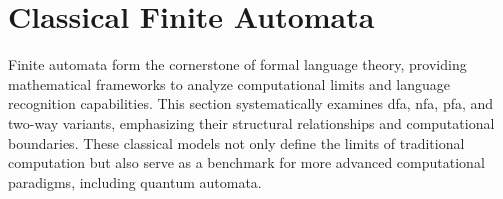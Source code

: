 \section{Classical Finite Automata}
\label{sec:classical-finite-automata} 

Finite automata form the cornerstone of formal language theory, providing mathematical frameworks to analyze computational limits and language recognition capabilities. This section systematically examines \gls{dfa}, \gls{nfa}, \gls{pfa}, and two-way variants, emphasizing their structural relationships and computational boundaries. These classical models not only define the limits of traditional computation but also serve as a benchmark for more advanced computational paradigms, including quantum automata.





